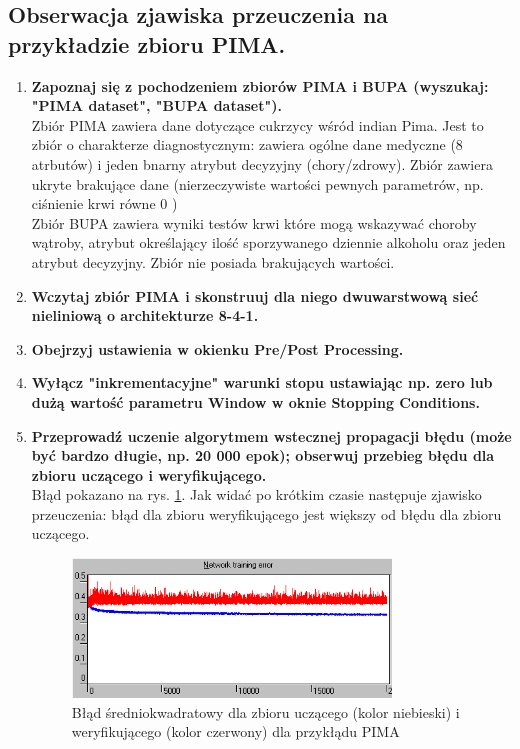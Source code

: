 \subsection{Obserwacja zjawiska przeuczenia na przykładzie zbioru PIMA.}
\begin{enumerate}
\item \textbf{ Zapoznaj się z pochodzeniem zbiorów PIMA i BUPA (wyszukaj: "PIMA dataset", "BUPA dataset").}
\\Zbiór PIMA zawiera dane dotyczące cukrzycy wśród indian Pima. Jest to zbiór o charakterze diagnostycznym: zawiera ogólne dane medyczne (8 atrbutów) i jeden bnarny atrybut decyzyjny (chory/zdrowy). Zbiór zawiera ukryte brakujące dane (nierzeczywiste wartości pewnych parametrów, np. ciśnienie krwi równe 0 )
\\Zbiór BUPA zawiera wyniki testów krwi które mogą wskazywać choroby wątroby, atrybut określający ilość sporzywanego dziennie alkoholu oraz jeden atrybut decyzyjny. Zbiór nie posiada brakujących wartości.

\item \textbf{
Wczytaj zbiór PIMA i skonstruuj dla niego dwuwarstwową sieć nieliniową o architekturze 8-4-1.}

\item \textbf{
Obejrzyj ustawienia w okienku Pre/Post Processing.}

\item \textbf{
Wyłącz "inkrementacyjne" warunki stopu ustawiając np. zero lub dużą wartość parametru Window w oknie Stopping Conditions.}

\item \textbf{
Przeprowadź uczenie algorytmem wstecznej propagacji błędu (może być bardzo długie, np. 20 000 epok); obserwuj przebieg błędu dla zbioru uczącego i weryfikującego.}
\\Błąd pokazano na rys. \ref{fig:PIMA_error}. Jak widać po krótkim czasie następuje zjawisko przeuczenia: błąd dla zbioru weryfikującego jest większy od błędu dla zbioru uczącego.

\begin{figure}[h]
\centering
\includegraphics[width=0.8\textwidth]{dane/part1/zad3/error}
\caption{Błąd średniokwadratowy dla zbioru uczącego (kolor niebieski) i weryfikującego (kolor czerwony) dla przykłądu PIMA\label{fig:PIMA_error}}
\end{figure}
\end{enumerate}

